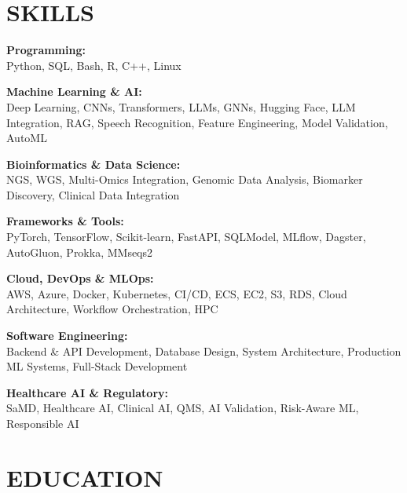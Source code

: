\documentclass[9pt, letterpaper]{extarticle}
\begin{document}
\hspace{0.4cm}
\begin{minipage}[t]{0.32\textwidth}
\raggedright


\section{SKILLS}
\small

\textbf{Programming:} \\[0.025cm]
Python, SQL, Bash, R, C++, Linux

\vspace{0.08cm}
\textbf{Machine Learning \& AI:} \\[0.025cm]
Deep Learning, CNNs, Transformers, LLMs, GNNs, Hugging Face, LLM Integration, RAG, Speech Recognition, Feature Engineering, Model Validation, AutoML

\vspace{0.08cm}
\textbf{Bioinformatics \& Data Science:} \\[0.025cm]
NGS, WGS, Multi-Omics Integration, Genomic Data Analysis, Biomarker Discovery, Clinical Data Integration

\vspace{0.08cm}
\textbf{Frameworks \& Tools:} \\[0.025cm]
PyTorch, TensorFlow, Scikit-learn, FastAPI, SQLModel, MLflow, Dagster, AutoGluon, Prokka, MMseqs2

\vspace{0.08cm}
\textbf{Cloud, DevOps \& MLOps:} \\[0.025cm]
AWS, Azure, Docker, Kubernetes, CI/CD, ECS, EC2, S3, RDS, Cloud Architecture, Workflow Orchestration, HPC

\vspace{0.08cm}
\textbf{Software Engineering:} \\[0.025cm]
Backend \& API Development, Database Design, System Architecture, Production ML Systems, Full-Stack Development

\vspace{0.08cm}
\textbf{Healthcare AI \& Regulatory:} \\[0.025cm]
SaMD, Healthcare AI, Clinical AI, QMS, AI Validation, Risk-Aware ML, Responsible AI

\section{EDUCATION}
\small


\end{minipage}
\end{document}
